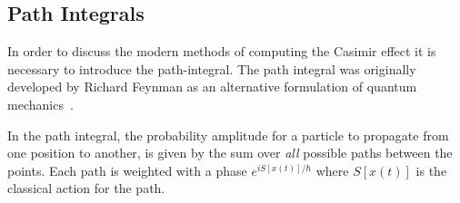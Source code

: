 
\subsection{Path Integrals}
\label{sec:feynman_path_integral}
In order to discuss the modern methods of computing the Casimir effect it is necessary to introduce
the path-integral. 
The path integral was originally developed by Richard Feynman as an alternative 
formulation of quantum mechanics~\cite{Feynman1948,Feynman1965}.
  
In the path integral, the probability amplitude for a particle to propagate from one position to another,
is given by the sum over \emph{all} possible paths between the points.  
Each path is weighted with a phase $e^{iS[x(t)]/\hbar}$ where $S[x(t)]$ is the classical action for the path.


